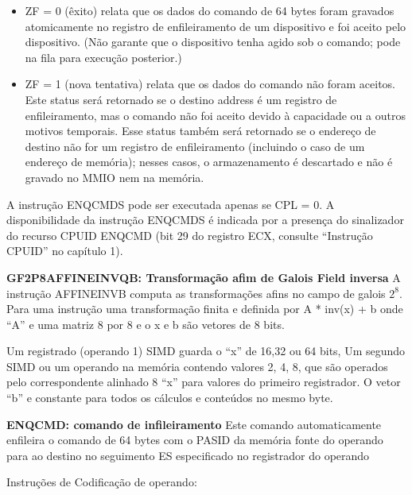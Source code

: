 \documentclass[12pt,a4paper,brazilian,utf8]{ppgsi}
\begin{document}
    \begin{itemize}
        \item ZF = 0 (êxito) relata que os dados do comando de 64 bytes foram gravados atomicamente no registro de enfileiramento de um dispositivo e foi aceito pelo dispositivo. (Não garante que o dispositivo tenha agido sob o comando; pode na fila para execução posterior.)
        \item ZF = 1 (nova tentativa) relata que os dados do comando não foram aceitos. Este status será retornado se o destino address é um registro de enfileiramento, mas o comando não foi aceito devido à capacidade ou a outros motivos temporais.   Esse status também será retornado se o endereço de destino não for um registro de enfileiramento (incluindo o caso de um endereço de memória); nesses casos, o armazenamento é descartado e não é gravado no MMIO nem na memória.
    \end{itemize}
    A instrução ENQCMDS pode ser executada apenas se CPL = 0. A disponibilidade da instrução ENQCMDS é indicada por a presença do sinalizador do recurso CPUID ENQCMD (bit 29 do registro ECX, consulte “Instrução CPUID” no capítulo 1).
    
    \textbf {GF2P8AFFINEINVQB: Transformação afim de Galois Field inversa}
    A instrução AFFINEINVB computa as transformações afins no campo de galois $2^8$. Para uma instrução uma transformação finita e definida por A * inv(x) + b onde “A” e uma matriz 8 por 8 e o x e b são vetores de 8 bits.
    
    Um registrado (operando 1) SIMD guarda o “x” de 16,32 ou 64 bits, Um segundo SIMD ou um operando na memória contendo valores 2, 4, 8, que são operados pelo correspondente alinhado 8 “x” para valores do primeiro registrador. O vetor “b” e constante para todos os cálculos e conteúdos no mesmo byte.
    
    \textbf {ENQCMD: comando de infileiramento}
    Este comando automaticamente enfileira o comando de 64 bytes com o PASID da memória fonte do operando para ao destino no seguimento ES especificado no registrador do operando 
    
    Instruções de Codificação de operando: 
    
\end{document}
